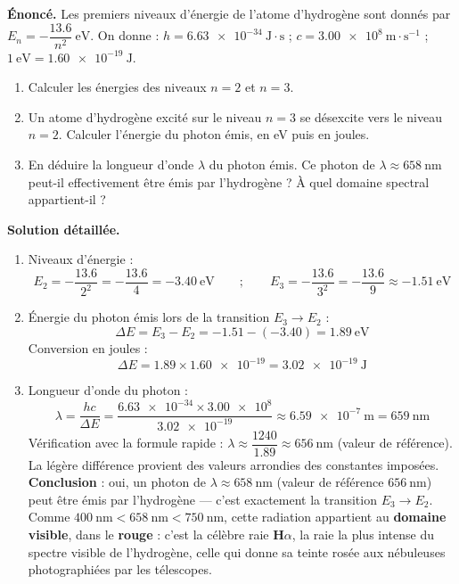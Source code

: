 \documentclass[11pt]{article}
\begin{document}
\begin{exoresolu}
\textbf{Énoncé.} Les premiers niveaux d'énergie de l'atome d'hydrogène sont donnés par $E_n = -\dfrac{\num{13,6}}{n^2}\ \mathrm{eV}$. On donne : $h = \num{6,63e-34}\ \mathrm{J \cdot s}$ ; $c = \num{3,00e8}\ \mathrm{m \cdot s^{-1}}$ ; $1\ \mathrm{eV} = \num{1,60e-19}\ \mathrm{J}$.
\begin{enumerate}
\item Calculer les énergies des niveaux $n = 2$ et $n = 3$.
\item Un atome d'hydrogène excité sur le niveau $n = 3$ se désexcite vers le niveau $n = 2$. Calculer l'énergie du photon émis, en eV puis en joules.
\item En déduire la longueur d'onde $\lambda$ du photon émis. Ce photon de $\lambda \approx \num{658}\ \mathrm{nm}$ peut-il effectivement être émis par l'hydrogène ? À quel domaine spectral appartient-il ?
\end{enumerate}
\tcblower
\textbf{Solution détaillée.}
\begin{enumerate}
\item Niveaux d'énergie :
\[
E_2 = -\dfrac{\num{13,6}}{2^2} = -\dfrac{\num{13,6}}{4} = \num{-3,40}\ \mathrm{eV} \qquad ; \qquad E_3 = -\dfrac{\num{13,6}}{3^2} = -\dfrac{\num{13,6}}{9} \approx \num{-1,51}\ \mathrm{eV}
\]
\item Énergie du photon émis lors de la transition $E_3 \to E_2$ :
\[
\Delta E = E_3 - E_2 = \num{-1,51} - (\num{-3,40}) = \num{1,89}\ \mathrm{eV}
\]
Conversion en joules :
\[
\Delta E = \num{1,89} \times \num{1,60e-19} = \num{3,02e-19}\ \mathrm{J}
\]
\item Longueur d'onde du photon :
\[
\lambda = \dfrac{hc}{\Delta E} = \dfrac{\num{6,63e-34} \times \num{3,00e8}}{\num{3,02e-19}} \approx \num{6,59e-7}\ \mathrm{m} = \num{659}\ \mathrm{nm}
\]
Vérification avec la formule rapide : $\lambda \approx \dfrac{1240}{\num{1,89}} \approx \num{656}\ \mathrm{nm}$ (valeur de référence). La légère différence provient des valeurs arrondies des constantes imposées. \textbf{Conclusion} : oui, un photon de $\lambda \approx \num{658}\ \mathrm{nm}$ (valeur de référence $\num{656}\ \mathrm{nm}$) peut être émis par l'hydrogène — c'est exactement la transition $E_3 \to E_2$. Comme $400\ \mathrm{nm} < 658\ \mathrm{nm} < 750\ \mathrm{nm}$, cette radiation appartient au \textbf{domaine visible}, dans le \textbf{rouge} : c'est la célèbre raie \textbf{H$\alpha$}, la raie la plus intense du spectre visible de l'hydrogène, celle qui donne sa teinte rosée aux nébuleuses photographiées par les télescopes.
\end{enumerate}
\end{exoresolu}
\end{document}
